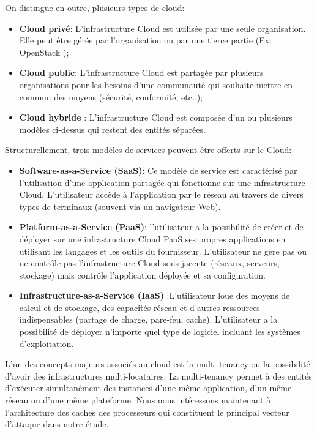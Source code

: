  On distingue en outre, plusieurs types de cloud: 

 \begin{itemize} 
 \item  \textbf{Cloud privé}: L’infrastructure Cloud est utilisée par une seule organisation. Elle peut être gérée par l’organisation ou par une tierce partie (Ex: OpenStack \cite{openstack});
 \item  \textbf{ Cloud public}: L’infrastructure Cloud est partagée par plusieurs organisations pour les besoins d’une communauté qui souhaite mettre en commun des moyens (sécurité, conformité, etc..);
 \item  \textbf{Cloud hybride} : L’infrastructure Cloud est composée d’un ou plusieurs modèles  ci-dessus qui restent des entités séparées. 
\end{itemize}\newline


Structurellement, trois modèles de services peuvent être offerts sur le Cloud:              
   
\begin{itemize} 
 \item  \textbf{Software-as-a-Service (SaaS)}: Ce modèle de service est caractérisé par l’utilisation d’une application partagée qui fonctionne sur une infrastructure Cloud. L’utilisateur accède  à l’application par le réseau au travers de divers types de terminaux (souvent via un navigateur Web). 
 \item  \textbf{ Platform-as-a-Service (PaaS)}: l’utilisateur a la possibilité de créer et de déployer sur une infrastructure Cloud PaaS ses propres applications en utilisant les langages et les outils du fournisseur. L’utilisateur ne gère pas ou ne contrôle pas l’infrastructure Cloud sous-jacente (réseaux, serveurs, stockage) mais contrôle l’application déployée et sa configuration.
 \item  \textbf{Infrastructure-as-a-Service (IaaS)} :L’utilisateur loue des moyens de calcul et de stockage, des capacités réseau et d’autres ressources indispensables (partage de charge, pare-feu, cache). L’utilisateur a la possibilité de déployer n’importe quel type de logiciel incluant les systèmes d’exploitation.  
\end{itemize} \newline
\par 
L’un des concepts majeurs associés au cloud est la multi-tenancy ou la possibilité d'avoir des infrastructures multi-locataires.  La multi-tenancy permet à des entités d’exécuter simultanément  des instances d’une même application, d’un même réseau ou d’une même plateforme.
Nous nous intéressons maintenant à l’architecture  des caches des processeurs qui constituent le principal vecteur d’attaque dans notre étude. 

